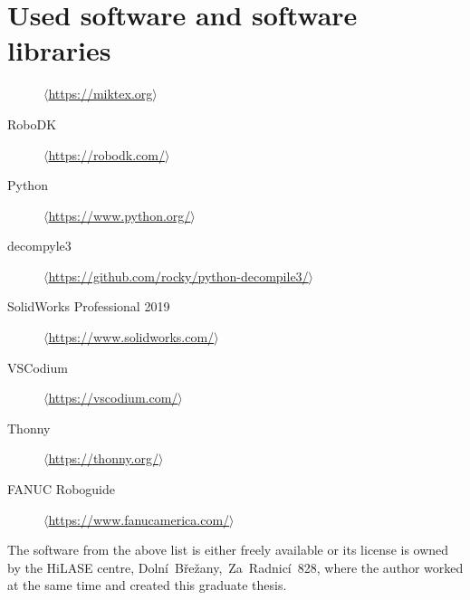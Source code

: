 ﻿\chapter{Used software and software libraries \label{ch:ApendSW}}



\begin{description}
    \item[\LaTeXe]
            \href{https://miktex.org/}
            {$\langle$https://miktex.org$\rangle$}
            
    \item[RoboDK]
            \href{https://robodk.com/}
            {$\langle$https://robodk.com/$\rangle$}
            
    \item[Python]
            \href{https://www.python.org/}
            {$\langle$https://www.python.org/$\rangle$}
    
    \item[decompyle3]
            \href{https://github.com/rocky/python-decompile3/}
            {$\langle$https://github.com/rocky/python-decompile3/$\rangle$}
            
    \item[SolidWorks Professional 2019]
            \href{https://www.solidworks.com/}
            {$\langle$https://www.solidworks.com/$\rangle$}
            
    \item[VSCodium]
            \href{https://vscodium.com/}
            {$\langle$https://vscodium.com/$\rangle$}
            
    \item[Thonny]
            \href{https://thonny.org/}
            {$\langle$https://thonny.org/$\rangle$}
            
    \item[FANUC Roboguide]
            \href{https://www.fanucamerica.com/products/robots/robot-simulation-software-FANUC-ROBOGUIDE}
            {$\langle$https://www.fanucamerica.com/$\rangle$}
\end{description}

The software from the above list is either freely available or its license is owned by the HiLASE centre, Dolní~Břežany,~Za~Radnicí~828, where the author worked at the same time and created this graduate thesis.




